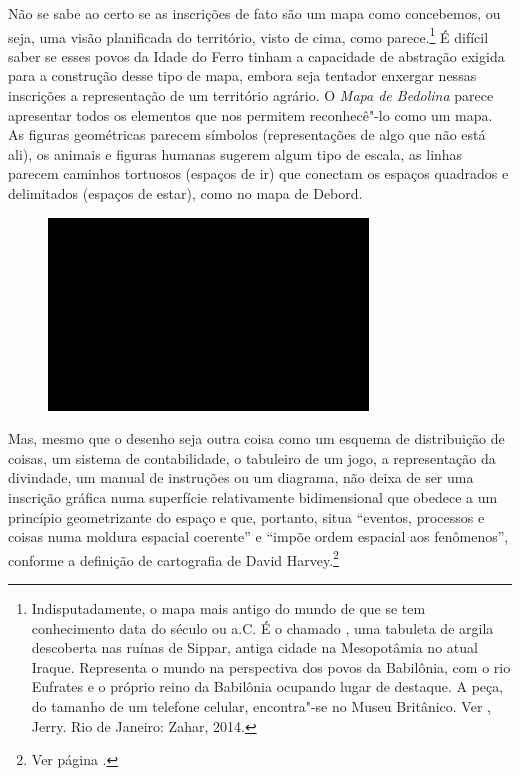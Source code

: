 Não se sabe ao certo se as inscrições de fato são um mapa como
concebemos, ou seja, uma visão planificada do território, visto de cima,
como parece.\footnote{Indisputadamente, o mapa mais antigo do mundo de
  que se tem conhecimento data do século  ou  a.C. É o chamado
  {}, uma tabuleta de argila descoberta nas ruínas de
  Sippar, antiga cidade na Mesopotâmia no atual Iraque. Representa o
  mundo na perspectiva dos povos da Babilônia, com o rio Eufrates e o
  próprio reino da Babilônia ocupando lugar de destaque. A peça, do
  tamanho de um telefone celular, encontra"-se no Museu Britânico. Ver
  , Jerry. {} Rio de
  Janeiro: Zahar, 2014.} É difícil saber se esses povos da Idade do
Ferro tinham a capacidade de abstração exigida para a construção desse
tipo de mapa, embora seja tentador enxergar nessas inscrições a
representação de um território agrário. O \emph{Mapa de Bedolina} parece
apresentar todos os elementos que nos permitem reconhecê"-lo como um
mapa. As figuras geométricas parecem símbolos (representações de algo
que não está ali), os animais e figuras humanas sugerem algum tipo de
escala, as linhas parecem caminhos tortuosos (espaços de ir) que
conectam os espaços quadrados e delimitados (espaços de estar), como no
mapa de Debord.

\begin{figure}[!ht]

\centering
 \includegraphics[width=85mm]{./imgs/im1.jpg}
\caption{\tiny{}}

\end{figure}

Mas, mesmo que o desenho seja outra coisa como um esquema de
distribuição de coisas, um sistema de contabilidade, o tabuleiro de um
jogo, a representação da divindade, um manual de instruções ou um
diagrama, não deixa de ser uma inscrição gráfica numa superfície
relativamente bidimensional que obedece a um princípio geometrizante do
espaço e que, portanto, situa ``eventos, processos e coisas numa moldura
espacial coerente'' e ``impõe ordem espacial aos fenômenos'', conforme a
definição de cartografia de David Harvey.\footnote{Ver página \pageref{harvey}.}

